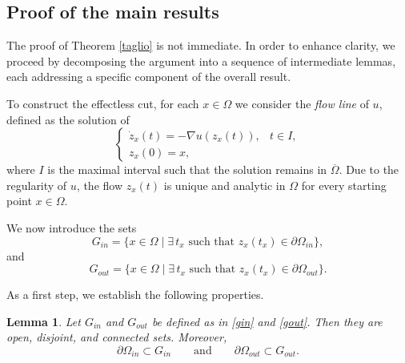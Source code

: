 \documentclass[oneside,a4paper,11pt,notitlepage]{article}
\theoremstyle{plain}
\numberwithin{teor}{section}
\numberwithin{equation}{section}
\theoremstyle{definition}
\theoremstyle{plain}
\newtheorem{lemma}[lemma]{Lemma}
\theoremstyle{plain}
\theoremstyle{plain}
\theoremstyle{plain}
\theoremstyle{definition}
\theoremstyle{definition}
\theoremstyle{plain}
\begin{document}
\subsection{Proof of the main results}
The proof of Theorem \ref{taglio} is not immediate. In order to enhance clarity, we proceed by decomposing the argument into a sequence of intermediate lemmas, each addressing a specific component of the overall result.

To construct the effectless cut, for each $x \in \Omega$ we consider the \emph{flow line} of $u$, defined as the solution of
\begin{equation}
    \label{flow}
    \begin{cases}
        \dot z_x(t) = - \nabla u(z_x(t)), & t \in I, \\
        z_x(0) = x,
    \end{cases}
\end{equation}
where $I$ is the maximal interval such that the solution remains in $\overline{\Omega}$.
Due to the regularity of $u$, the flow $z_x(t)$ is unique and analytic in $\Omega$ for every starting point $x \in \Omega$.

We now introduce the sets
\begin{equation}
\label{gin}
    G_{in} = \{ x \in \Omega \mid \exists\, t_x \text{ such that } z_x(t_x) \in \partial \Omega_{in} \},
\end{equation}
and
\begin{equation}
\label{gout}
    G_{out} = \{ x \in \Omega \mid \exists\, t_x \text{ such that } z_x(t_x) \in \partial \Omega_{out} \}.
\end{equation}

As a first step, we establish the following properties.

\begin{lemma}\label{G_aperti}
Let $G_{in}$ and $G_{out}$ be defined as in \eqref{gin} and \eqref{gout}. Then they are open, disjoint, and connected sets.
Moreover,
\[
\partial \Omega_{in} \subset G_{in}
\qquad \text{and} \qquad
\partial \Omega_{out} \subset G_{out}.
\]
\end{lemma}
\end{document}
